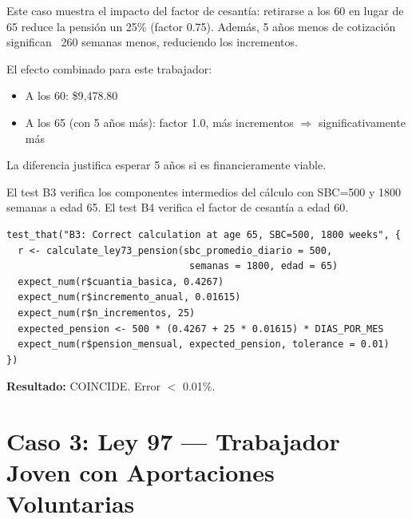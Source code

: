\documentclass[11pt,a4paper]{report}
\begin{document}
\begin{tcolorbox}[colback=green!5!white, colframe=green!50!black, title=\textbf{Intuici\'on}]
Este caso muestra el impacto del factor de cesant\'ia: retirarse a los 60 en lugar de 65 reduce la pensi\'on un 25\% (factor 0.75). Adem\'as, 5 a\~nos menos de cotizaci\'on significan ~260 semanas menos, reduciendo los incrementos.

El efecto combinado para este trabajador:
\begin{itemize}
  \item A los 60: \$9,478.80
  \item A los 65 (con 5 a\~nos m\'as): factor 1.0, m\'as incrementos $\Rightarrow$ significativamente m\'as
\end{itemize}

La diferencia justifica esperar 5 a\~nos si es financieramente viable.
\end{tcolorbox}

\begin{tcolorbox}[colback=orange!5!white, colframe=orange!75!black, title=\textbf{Aplicaci\'on en C\'odigo: Verificaci\'on}]
El test B3 verifica los componentes intermedios del c\'alculo con SBC=500 y 1800 semanas a edad 65. El test B4 verifica el factor de cesant\'ia a edad 60.

\begin{lstlisting}
test_that("B3: Correct calculation at age 65, SBC=500, 1800 weeks", {
  r <- calculate_ley73_pension(sbc_promedio_diario = 500,
                                semanas = 1800, edad = 65)
  expect_num(r$cuantia_basica, 0.4267)
  expect_num(r$incremento_anual, 0.01615)
  expect_num(r$n_incrementos, 25)
  expected_pension <- 500 * (0.4267 + 25 * 0.01615) * DIAS_POR_MES
  expect_num(r$pension_mensual, expected_pension, tolerance = 0.01)
})
\end{lstlisting}

\textbf{Resultado:} COINCIDE. Error $<$ 0.01\%.
\end{tcolorbox}


\section{Caso 3: Ley 97 --- Trabajador Joven con Aportaciones Voluntarias}
\end{document}
